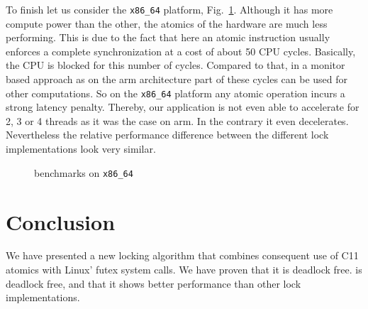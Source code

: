 To finish let us consider the \texttt{x86\_64} platform, Fig.~\ref{fig:x86_64}. Although it
has more compute power than the other, the atomics of the hardware
are much less performing. This is due to the fact that here an
atomic instruction usually enforces a complete
synchronization at a cost of about 50 CPU cycles. Basically, the CPU
is blocked for this number of cycles. Compared to that, in a monitor based approach
as on the arm architecture part of these cycles can be used for other computations.
So on the \texttt{x86\_64} platform any atomic operation incurs a strong latency
penalty. Thereby, our application is not even able to accelerate for
2, 3 or 4 threads as it was the case on arm. In the contrary it
even decelerates.
Nevertheless the relative performance difference between the
different lock implementations look very similar.
\begin{figure}[t]
  \caption{benchmarks on \texttt{x86\_64}}
  \label{fig:x86_64}
\end{figure}

\section{Conclusion}
\label{sec-5}

We have presented a new locking algorithm that combines consequent use
of C11 atomics with Linux' futex system calls. We have proven that it
is deadlock free.
is deadlock free, and that it shows better
performance than other lock implementations.

